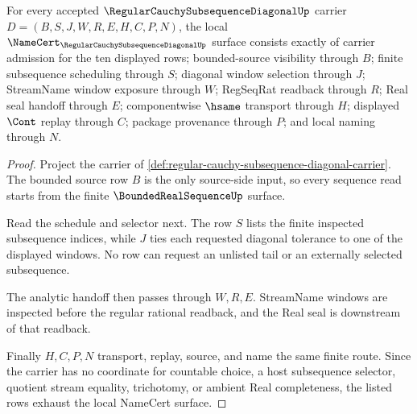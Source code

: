 \begin{theorem}
\label{thm:regular-cauchy-subsequence-diagonal-namecert-obligations}
For every accepted $\RegularCauchySubsequenceDiagonalUp$ carrier $D=(B,S,J,W,R,E,H,C,P,N)$, the local $\NameCert_{\RegularCauchySubsequenceDiagonalUp}$ surface consists exactly of carrier admission for the ten displayed rows; bounded-source visibility through $B$; finite subsequence scheduling through $S$; diagonal window selection through $J$; StreamName window exposure through $W$; RegSeqRat readback through $R$; Real seal handoff through $E$; componentwise $\hsame$ transport through $H$; displayed $\Cont$ replay through $C$; package provenance through $P$; and local naming through $N$.
\end{theorem}
\begin{proof}
Project the carrier of \autoref{def:regular-cauchy-subsequence-diagonal-carrier}. The bounded source row $B$ is the only source-side input, so every sequence read starts from the finite $\BoundedRealSequenceUp$ surface.

Read the schedule and selector next. The row $S$ lists the finite inspected subsequence indices, while $J$ ties each requested diagonal tolerance to one of the displayed windows. No row can request an unlisted tail or an externally selected subsequence.

The analytic handoff then passes through $W,R,E$. StreamName windows are inspected before the regular rational readback, and the Real seal is downstream of that readback.

Finally $H,C,P,N$ transport, replay, source, and name the same finite route. Since the carrier has no coordinate for countable choice, a host subsequence selector, quotient stream equality, trichotomy, or ambient Real completeness, the listed rows exhaust the local NameCert surface.
\end{proof}

